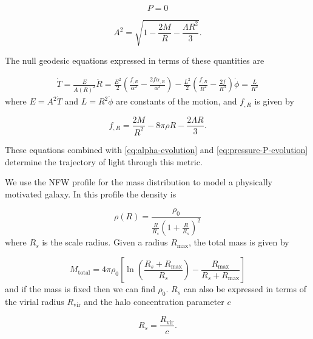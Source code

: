 \begin{equation}
  P = 0
\end{equation}

\begin{equation}
  A^2 = \sqrt{1- \frac{2M}{R} - \frac{\Lambda R^2}{3}}.
\end{equation}

The null geodesic equations expressed in terms of these quantities are

\begin{subequations}
  \begin{align}
    \dot{T} = \frac{E}{A(R)^2}
    \ddot{R} = \frac{E^2}{2}\left ( \frac{f_{,R}}{\alpha^2} - \frac{2f\alpha_{,R}}{\alpha^3} \right ) - \frac{L^2}{2} \left ( \frac{f_{,R}}{R^2} - \frac{2f}{R^3} \right )
    \dot{\phi} = \frac{L}{R^2}
  \end{align}
  \label{eq:ltb-null-geodesics}
\end{subequations}
where $E = A^2\dot{T}$ and $L = R^2\dot{\phi}$ are constants of the motion, and $f_{,R}$ is given by

\begin{equation}
  f_{,R} = \frac{2M}{R^2} - 8\pi \rho R - \frac{2 \Lambda R}{3}.
\end{equation}

These equations combined with \autoref{eq:alpha-evolution} and \autoref{eq:pressure-P-evolution} determine the trajectory of light through this metric. 

We use the NFW profile \citep{navarro1996structure} for the mass distribution to model a physically motivated galaxy. In this profile the density is

\begin{equation}
  \rho(R) = \frac{\rho_0}{\frac{R}{R_s} \left ( 1 + \frac{R}{R_s} \right )^2}
  \label{eq:nfw-density}
\end{equation}
where $R_s$ is the scale radius. Given a radius $R_{\text{max}}$, the total mass is given by

\begin{equation}
  M_{\text{total}} = 4\pi \rho_0 \left [  \ln \left ( \frac{R_s + R_{\text{max}}}{R_s} \right ) - \frac{R_{\text{max}}}{R_s + R_{\text{max}}} \right ]
  \label{eq:nfw-total-mass}
\end{equation}
and if the mass is fixed then we can find $\rho_0$. $R_s$ can also be expressed in terms of the virial radius $R_{\text{vir}}$ and the halo concentration parameter $c$

\begin{equation}
  R_s = \frac{R_{\text{vir}}}{c}.
\end{equation}

